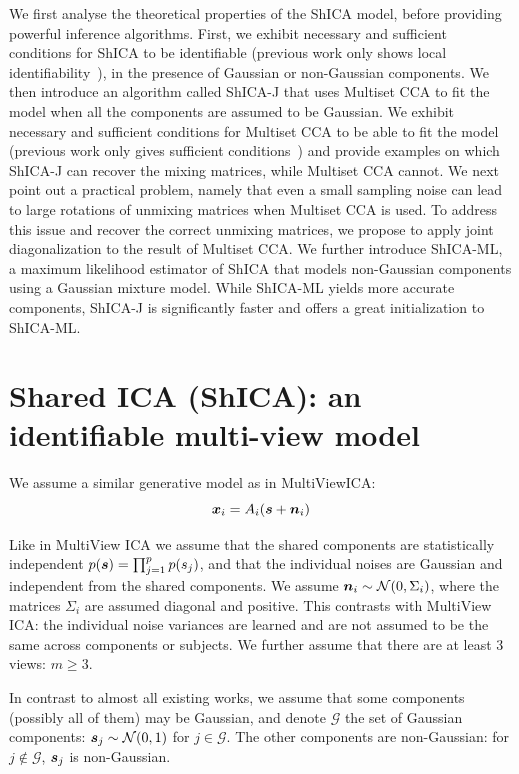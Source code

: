 We first analyse the theoretical properties of the ShICA model, before providing powerful inference algorithms.
First, we exhibit necessary and sufficient conditions for ShICA to be identifiable (previous work only shows local identifiability~\cite{anderson2014independent}), in the presence of Gaussian or non-Gaussian components. 
%
We then introduce an algorithm called ShICA-J that uses Multiset CCA to fit the model when all the components are assumed to be Gaussian. We exhibit necessary and sufficient conditions for Multiset CCA to be able to fit the model (previous work only gives sufficient conditions~\cite{li2009joint}) and provide examples on which ShICA-J can recover the mixing matrices, while Multiset CCA cannot. 
%
We next point out a practical problem, namely that even a small sampling noise can lead to large rotations of unmixing matrices when Multiset CCA is used. To address this issue and recover the correct unmixing matrices, we propose to apply joint diagonalization to the result of Multiset CCA.
%
We further introduce ShICA-ML, a maximum likelihood estimator of ShICA that models non-Gaussian components using a Gaussian mixture model. 
%
While ShICA-ML yields more accurate components, ShICA-J is significantly faster and offers a great initialization to ShICA-ML.

\section{Shared ICA (ShICA): an identifiable multi-view model}
We assume a similar generative model as in MultiViewICA:
\begin{equation}
  \label{eq:model}
   \boldsymbol{x}_i = A_i(\boldsymbol{s} + \boldsymbol{n}_i)
\end{equation}

Like in MultiView ICA we assume that the shared components are statistically independent $p(\boldsymbol{s}) = \prod_{j=1}^p p(s_j)$, and
that the individual noises are Gaussian and independent from the shared
components. We assume $\boldsymbol{n}_i \sim\mathcal{N}(0, \Sigma_i)$, where the matrices
$\Sigma_i$ are assumed diagonal and positive. This contrasts with MultiView ICA: the individual noise variances are learned and are not assumed to be the same across
components or subjects.
We further assume that there are at least 3 views: $m \geq 3$. 

In contrast to almost all existing works, we assume that some components (possibly all of them) may be Gaussian, and denote $\mathcal{G}$ the set of Gaussian components: $\boldsymbol{s}_j \sim \mathcal{N}(0, 1)$ for $j \in \mathcal{G}$. The other components are non-Gaussian: for $j\notin \mathcal{G}$, $\boldsymbol{s}_j$ is non-Gaussian.


